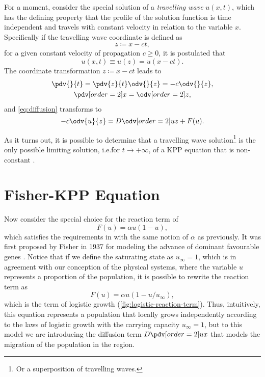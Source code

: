 For a moment, consider the special solution of a \emph{travelling wave} \(u(x,t)\), which has the defining property that
    the profile of the solution function is time independent and travels with constant velocity in relation to the 
    variable \(x\).
Specifically if the travelling wave coordinate is defined as \[
    z \coloneqq x - ct,
    \] for a given constant velocity of propagation \(c \ge 0\), it is postulated that \[
        u(x,t) \equiv u(z) = u(x - ct).
    \]
The coordinate transformation \(z \coloneqq x - ct\) leads to \begin{equation}\label{eq:tw-transformation}
    \begin{gathered}
        \pdv{}{t} = \pdv{z}{t} \odv{}{z} = -c \odv{}{z},\\
        \pdv[order={2}]{}{x} = \odv[order={2}]{}{z},
    \end{gathered}
\end{equation}
and \cref{eq:diffusion} transforms to \begin{equation*}
    -c \odv{u}{z} = D\odv[order={2}]{u}{z} + F(u).
\end{equation*}

As it turns out, it is possible to determine that a travelling wave solution\footnote{Or a superposition of travelling
    waves.} is the only possible limiting solution, i.e.\@ for \(t \to +\infty\), of a \ac{KPP} equation that is 
    non-constant \cite{kolmogorov1937a}. 


\section{Fisher-\ac{KPP} Equation}%
\label{sec:fisher-kpp-equation}

Now consider the special choice for the reaction term of \[
    F(u) = \alpha u (1 - u),
    \] which satisfies the requirements in  with the same notion of \(\alpha\) as 
    previously.
It was first proposed by Fisher in 1937 for modeling the advance of dominant favourable genes 
    \cite{wikipedia-KPP-Fisher}.
Notice that if we define the saturating state as \(u_{\infty} = 1\), which is in agreement with our conception of the
    physical systems, where the variable \(u\) represents a proportion of the population, it is possible to rewrite the 
    reaction term as \begin{equation}
        \label{eq:fisher-reaction-term}
        F(u) = \alpha u (1 - u/u_{\infty}),
    \end{equation}
    which is the term of logistic growth (\cref{fig:logistic-reaction-term}).
Thus, intuitively, this equation represents a population that locally grows independently according to the laws of
    logistic growth with the carrying capacity \(u_\infty = 1\), but to this model we are introducing the diffusion term
    \(D\pdv[order={2}]{u}{x}\) that models the migration of the population in the region.

